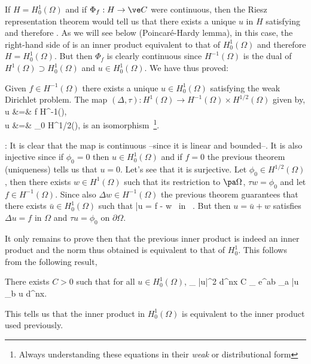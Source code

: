 If $H = H^1_0(\Omega) $ and if $\Phi_f: H \rightarrow \ve C$ were
continuous, then the Riesz representation theorem would tell us that
there exists a unique $u$ in $H$ satisfying  and therefore .
As we will see below (Poincaré-Hardy lemma), in this case, the right-hand side of  is an inner product equivalent to that of 
$H^1_0(\Omega)$
and therefore $H = H^1_0(\Omega) $. But then $\Phi_f$ is clearly
continuous since $H^{-1}(\Omega)$ is the dual of 
$H^1(\Omega) \supset H^1_0(\Omega)$
and $u \in H^1_0(\Omega)$. We have thus proved:

 Given $f \in H^{-1}(\Omega)$ there exists a
unique $u \in H^1_0(\Omega)$ satisfying the weak Dirichlet problem.  
\eteo
\bcor
  The map $(\Delta,\tau) : H^1(\Omega) \rightarrow H^{-1}(\Omega)
\times H^{1/2}(\Omega)$ given by,
\beq {}
\Delta u &=& f \in H^{-1}(\Omega),\\
\tau u &=& \phi_0 \in H^{1/2}(\pa \Omega),
\earr
\eeq 
is an isomorphism~\footnote{Always understanding these equations in
their {\sl weak} or distributional form}.
\ecor

\pru:
It is clear that the map is continuous --since it is linear and bounded--. 
It is also
injective since if $\phi_0 = 0$ then $u \in H^1_0(\Omega)$ and if $f=0$
the previous theorem (uniqueness) tells us that $u=0$.
Let's see that it is surjective. Let $\phi_0 \in H^{1/2}(\Omega)$, then there exists
$w \in H^1(\Omega) $ such that its restriction to $\pa \Omega$,  
$\tau w = \phi_0$ and let $f \in H^{-1}(\Omega)$. 
Since also $\Delta w \in H^{-1}(\Omega)$ the previous theorem
guarantees that there exists $\bar u \in H^1_0(\Omega)$ such that 
\beq
\Delta \bar u = f - \Delta w \mbox{ in } \Omega.
\eeq
But then $u = \bar u + w$ satisfies $\Delta u = f$ in $\Omega$ and 
$\tau u = \phi_0 $ on $\partial \Omega$.

\espa

\noi It only remains to prove then that the previous inner product is indeed an inner product and the norm thus obtained is equivalent to that of $H^{1}_{0}$. This follows from the following result,

\label{lem12.1}
There exists $C>0$ such that for all 
$u \in H^1_0(\Omega)$,
\beq
\int_{\Omega} |u|^2 \; d^nx \leq C \int_{\Omega} e^{ab} \nabla_a \bar u
\nabla_b u \; d^nx.
\eeq
\elem

This tells us that the inner product in $H^1_0(\Omega)$ is equivalent
to the inner product used previously.

